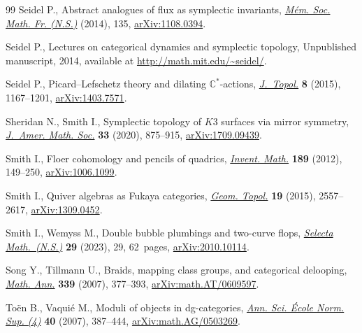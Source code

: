 \begin{thebibliography}{99}
Seidel P., Abstract analogues of flux as symplectic invariants,
 \href{https://doi.org/10.24033/msmf.447}{\textit{M\'em. Soc. Math. Fr.
 (N.S.)}} (2014), 135,
 \href{http://arxiv.org/abs/1108.0394}{arXiv:1108.0394}.

Seidel P., Lectures on categorical dynamics and symplectic topology,
 {U}npublished manuscript, 2014, available at
 \url{http://math.mit.edu/~seidel/}.

Seidel P., Picard--{L}efschetz theory and dilating {$\mathbb{C}^*$}-actions,
 \href{https://doi.org/10.1112/jtopol/jtv029}{\textit{J.~Topol.}} \textbf{8}
 (2015), 1167--1201, \href{http://arxiv.org/abs/1403.7571}{arXiv:1403.7571}.

Sheridan N., Smith I., Symplectic topology of {$K3$} surfaces via mirror
 symmetry, \href{https://doi.org/10.1090/jams/946}{\textit{J.~Amer. Math.
 Soc.}} \textbf{33} (2020), 875--915,
 \href{http://arxiv.org/abs/1709.09439}{arXiv:1709.09439}.

Smith I., Floer cohomology and pencils of quadrics,
 \href{https://doi.org/10.1007/s00222-011-0364-1}{\textit{Invent. Math.}}
 \textbf{189} (2012), 149--250,
 \href{http://arxiv.org/abs/1006.1099}{arXiv:1006.1099}.

Smith I., Quiver algebras as {F}ukaya categories,
 \href{https://doi.org/10.2140/gt.2015.19.2557}{\textit{Geom. Topol.}}
 \textbf{19} (2015), 2557--2617,
 \href{http://arxiv.org/abs/1309.0452}{arXiv:1309.0452}.

Smith I., Wemyss M., Double bubble plumbings and two-curve flops,
 \href{https://doi.org/10.1007/s00029-023-00828-z}{\textit{Selecta
 Math.~(N.S.)}} \textbf{29} (2023), 29, 62~pages,
 \href{http://arxiv.org/abs/2010.10114}{arXiv:2010.10114}.

Song Y., Tillmann U., Braids, mapping class groups, and categorical delooping,
 \href{https://doi.org/10.1007/s00208-007-0117-z}{\textit{Math. Ann.}}
 \textbf{339} (2007), 377--393, \href{http://arxiv.org/abs/math.AT/0609597}{arXiv:math.AT/0609597}.

To\"{e}n B., Vaqui\'e M., Moduli of objects in dg-categories,
 \href{https://doi.org/10.1016/j.ansens.2007.05.001}{\textit{Ann. Sci.
 \'{E}cole Norm. Sup. (4)}} \textbf{40} (2007), 387--444, \href{http://arxiv.org/abs/math.AG/0503269}{arXiv:math.AG/0503269}.


\end{thebibliography}
